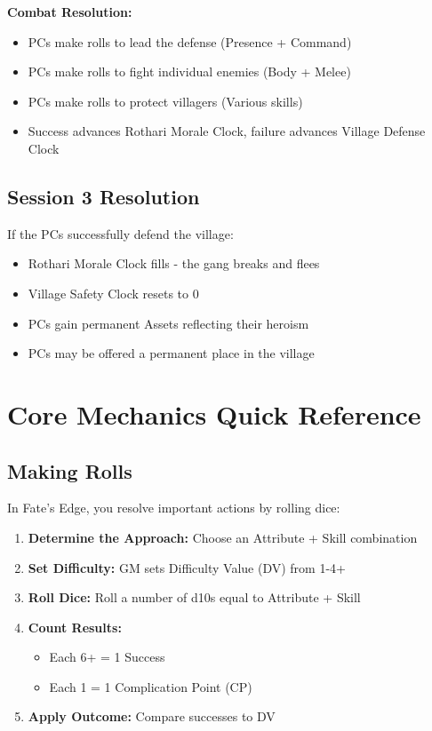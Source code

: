 \documentclass[11pt]{article}
\begin{document}
\textbf{Combat Resolution:}
\begin{itemize}
\item PCs make rolls to lead the defense (Presence + Command)
\item PCs make rolls to fight individual enemies (Body + Melee)
\item PCs make rolls to protect villagers (Various skills)
\item Success advances Rothari Morale Clock, failure advances Village Defense Clock
\end{itemize}

\subsection{Session 3 Resolution}

If the PCs successfully defend the village:
\begin{itemize}
\item Rothari Morale Clock fills - the gang breaks and flees
\item Village Safety Clock resets to 0
\item PCs gain permanent Assets reflecting their heroism
\item PCs may be offered a permanent place in the village
\end{itemize}

\section{Core Mechanics Quick Reference}

\subsection{Making Rolls}

In Fate's Edge, you resolve important actions by rolling dice:
\begin{enumerate}
\item \textbf{Determine the Approach:} Choose an Attribute + Skill combination
\item \textbf{Set Difficulty:} GM sets Difficulty Value (DV) from 1-4+
\item \textbf{Roll Dice:} Roll a number of d10s equal to Attribute + Skill
\item \textbf{Count Results:}
   \begin{itemize}
   \item Each 6+ = 1 Success
   \item Each 1 = 1 Complication Point (CP)
   \end{itemize}
\item \textbf{Apply Outcome:} Compare successes to DV
\end{enumerate}
\end{document}
